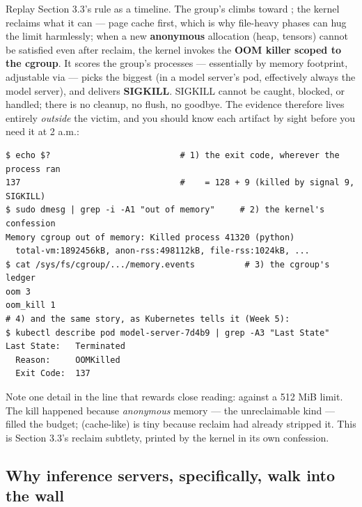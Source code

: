 Replay Section 3.3's rule as a timeline. The group's  climbs toward ; the kernel reclaims what it can — page cache first, which is why file-heavy phases can hug the limit harmlessly; when a new \textbf{anonymous} allocation (heap, tensors) cannot be satisfied even after reclaim, the kernel invokes the \textbf{OOM killer scoped to the cgroup}. It scores the group's processes — essentially by memory footprint, adjustable via  — picks the biggest (in a model server's pod, effectively always the model server), and delivers \textbf{SIGKILL}. SIGKILL cannot be caught, blocked, or handled; there is no cleanup, no flush, no goodbye. The evidence therefore lives entirely \textit{outside} the victim, and you should know each artifact by sight before you need it at 2 a.m.:

\begin{terminalbox}
\begin{Verbatim}[breaklines=true,breakanywhere=true,fontsize=\small,formatcom=\color{tbbtermfg},codes=\tbbcodeactive]
$ echo $?                          # 1) the exit code, wherever the process ran
137                                #    = 128 + 9 (killed by signal 9, SIGKILL)
$ sudo dmesg | grep -i -A1 "out of memory"     # 2) the kernel's confession
Memory cgroup out of memory: Killed process 41320 (python)
  total-vm:1892456kB, anon-rss:498112kB, file-rss:1024kB, ...
$ cat /sys/fs/cgroup/.../memory.events          # 3) the cgroup's ledger
oom 3
oom_kill 1
# 4) and the same story, as Kubernetes tells it (Week 5):
$ kubectl describe pod model-server-7d4b9 | grep -A3 "Last State"
Last State:   Terminated
  Reason:     OOMKilled
  Exit Code:  137
\end{Verbatim}
\end{terminalbox}

Note one detail in the  line that rewards close reading:  against a 512 MiB limit. The kill happened because \textit{anonymous} memory — the unreclaimable kind — filled the budget;  (cache-like) is tiny because reclaim had already stripped it. This is Section 3.3's reclaim subtlety, printed by the kernel in its own confession.

\subsection*{Why inference servers, specifically, walk into the wall}

